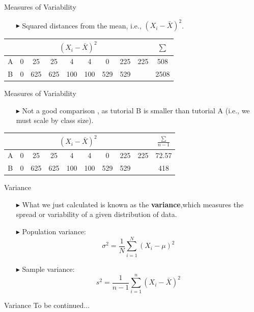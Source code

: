 \documentclass[12pt]{beamer}
\begin{document}
\begin{frame}{Measures of Variability}
	\begin{itemize}
		\item[$\blacktriangleright$]Squared distances from the mean, i.e., $(X_i-\bar{X})^2$.
	\end{itemize}
	\begin{center}
		\begin{tabular}{|c|c|c|c|c|c|c|c|c|c|}
			\hline
			\multicolumn{9}{|c|}{$(X_i-\bar{X})^2$} & $\sum$\\ \hline
			\hline
			A & 0& 25 & 25 & 4 & 4 & 0 & 225 & 225&508\\
			\hline
			B & 0 & 625 & 625 & 100 &100& 529& 529 &&2508\\
			\hline
		\end{tabular}
	\end{center}
\end{frame}
\begin{frame}{Measures of Variability}
	\begin{itemize}
		\item[$\blacktriangleright$]Not a good comparison \frownie, as tutorial B is smaller than tutorial A (i.e., we must scale by class size).
	\end{itemize}
	\begin{center}
		\begin{tabular}{|c|c|c|c|c|c|c|c|c|c|}
			\hline
			\multicolumn{9}{|c|}{$(X_i-\bar{X})^2$} & $\frac{\sum}{n-1}$\\ \hline
			\hline
			A & 0& 25 & 25 & 4 & 4 & 0 & 225 & 225&72.57\\
			\hline
			B & 0 & 625 & 625 & 100 &100& 529& 529 &&418\\
			\hline
		\end{tabular}
	\end{center}
\end{frame}
\begin{frame}{Variance}
	\begin{itemize}
		\item[$\blacktriangleright$]What we just calculated is known as the {\bf variance},which measures the spread or variability of a given distribution of data.
		\item[$\blacktriangleright$]Population variance:$$\sigma^2=\frac{1}{N}\sum_{i=1}^N(X_i-\mu)^2$$
		\item[$\blacktriangleright$]Sample variance:
		$$s^2=\frac{1}{n-1}\sum_{i=1}^n(X_i-\bar{X})^2$$
	\end{itemize}
\end{frame}
\begin{frame}{Variance}
To be continued...
\end{frame}
\end{document}
